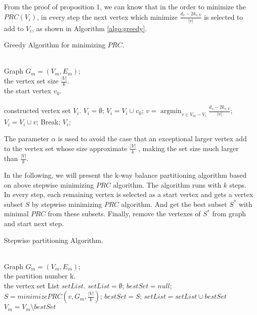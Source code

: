 \documentclass{acm_proc_article-sp}
\DeclareMathOperator*{\argmin}{argmin}
\begin{document}
From the proof of proposition 1, we can know that in the order to minimize the $PRC(V_{i})$, in every step the next vertex which minimize $\frac {d_{v}-2k_{v,V}}{|v|}$  is selected to add to $V_{i}$, as shown in Algorithm \ref{algo:greedy}.
\begin{algorithm}[htb]
\caption{Greedy Algorithm for minimizing $PRC$.}
\label{algo:greedy}
\begin{algorithmic}[1]
\REQUIRE ~~\\
Graph $G_{m}=(V_{m},E_{m})$;\\
the vertex set size $\frac{|V|}{k}$.\\
the start vertex $v_{0}$.\\
\ENSURE ~~\\
constructed vertex set $V_{i}$.
\STATE $V_{i}=\emptyset$;
\STATE $V_{i}=V_{i}\cup v_{0}$;
    \STATE $v=\mathop{\argmin}_{v \in V_{m}-V_{i}}{\frac{d_{v}-2k_{v,V}}{|v|}}$;
    \STATE $V_{i}=V_{i}\cup{v}$;
    \ELSE
    \STATE Break;
    \ENDIF
    \ENDIF
\ENDWHILE
\RETURN $V_{i}$;
\end{algorithmic}
\end{algorithm}
The parameter $\alpha$ is used to avoid the case that an exceptional larger vertex add to the vertex set whose size approximate $\frac{|V|}{k}$ , making the set size much larger than  $\frac{|V|}{k}$.
\par
In the following, we will present the k-way balance partitioning algorithm based on above stepwise minimizing $PRC$ algorithm. The algorithm runs with $k$ steps. In every step, each remaining vertex is selected as a start vertex and gets a vertex subset $S$ by stepwise minimizing $PRC$ algorithm. And get the best subset $S^{*}$ with minimal $PRC$ from these subsets. Finally, remove the vertexes of $S^{*}$ from graph and start next step.
\begin{algorithm}[htb]
\caption{Stepwise partitioning Algorithm.}
\label{algo:par}
\begin{algorithmic}[1]
\REQUIRE ~~\\
Graph $G_{m}=(V_{m},E_{m})$;\\
the partition number k.
\ENSURE ~~\\
the vertex set List $setList$.
\STATE $setList=\emptyset$;
\STATE $bestSet=null$;
            \STATE $S=minimizePRC(v,G_{m},\frac{|V|}{k})$;
                \STATE $bestSet=S$;
              \ENDIF
     \ENDFOR
       \STATE $setList=setList\cup bestSet$
       \STATE $V_{m}=V_{m}\setminus bestSet$
   \ENDFOR


\end{algorithmic}
\end{algorithm}
\end{document}
